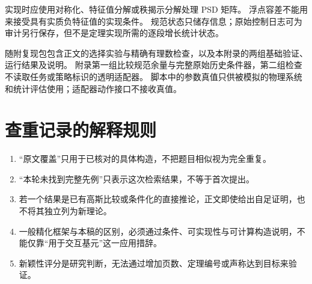 \documentclass[UTF8,fontset=fandol,11pt,a4paper]{ctexart}
\theoremstyle{definition}
\theoremstyle{remark}
\numberwithin{equation}{section}
\begin{document}
实现时应使用对称化、特征值分解或秩揭示分解处理 PSD 矩阵。
浮点容差不能用来接受具有实质负特征值的实现条件。
规范状态只储存信息；原始控制日志可为审计另行保存，但不是定理实现所需的逐段增长统计状态。

随附复现包包含正文的选择实验与精确有理数检查，以及本附录的两组基础验证、运行结果及说明。
附录第一组比较规范余量与完整原始历史条件器，第二组检查不读取任务或策略标识的透明适配器。
脚本中的参数真值只供被模拟的物理系统和统计评估使用；适配器动作接口不接收真值。

\section{查重记录的解释规则}
\begin{enumerate}
\item “原文覆盖”只用于已核对的具体构造，不把题目相似视为完全重复。
\item “本轮未找到完整先例”只表示这次检索结果，不等于首次提出。
\item 若一个结果是已有高斯比较或条件化的直接推论，正文即使给出自足证明，也不将其独立列为新理论。
\item 一般精化框架与本稿的区别，必须通过条件、可实现性与可计算构造说明，不能仅靠“用于交互基元”这一应用措辞。
\item 新颖性评分是研究判断，无法通过增加页数、定理编号或声称达到目标来验证。
\end{enumerate}
\end{document}
